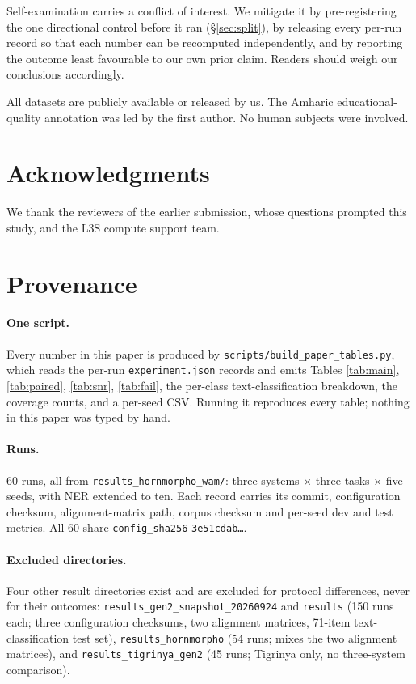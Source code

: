 \documentclass[11pt]{article}
\begin{document}
Self-examination carries a conflict of interest. We mitigate it by
pre-registering the one directional control before it ran
(\S\ref{sec:split}), by releasing every per-run record so that each number
can be recomputed independently, and by reporting the outcome least
favourable to our own prior claim. Readers should weigh our conclusions
accordingly.

All datasets are publicly available or released by us. The Amharic
educational-quality annotation was led by the first author. No human
subjects were involved.

\section*{Acknowledgments}

We thank the reviewers of the earlier submission, whose questions prompted
this study, and the L3S compute support team.



\appendix

\section{Provenance}
\label{app:prov}

\paragraph{One script.} Every number in this paper is produced by
\texttt{scripts/build\_paper\_tables.py}, which reads the per-run
\texttt{experiment.json} records and emits Tables \ref{tab:main},
\ref{tab:paired}, \ref{tab:snr}, \ref{tab:fail}, the per-class
text-classification breakdown, the coverage counts, and a per-seed CSV.
Running it reproduces every table; nothing in this paper was typed by hand.

\paragraph{Runs.} 60 runs, all from
\texttt{results\_hornmorpho\_wam/}: three systems $\times$ three tasks
$\times$ five seeds, with NER extended to ten. Each record carries its
commit, configuration checksum, alignment-matrix path, corpus checksum and
per-seed dev and test metrics. All 60 share
\texttt{config\_sha256} \texttt{3e51cdab\ldots}.

\paragraph{Excluded directories.} Four other result directories exist and are
excluded for protocol differences, never for their outcomes:
\texttt{results\_gen2\_snapshot\_20260924} and \texttt{results} (150 runs
each; three configuration checksums, two alignment matrices, 71-item
text-classification test set), \texttt{results\_hornmorpho} (54 runs; mixes
the two alignment matrices), and \texttt{results\_tigrinya\_gen2} (45 runs;
Tigrinya only, no three-system comparison).
\end{document}
